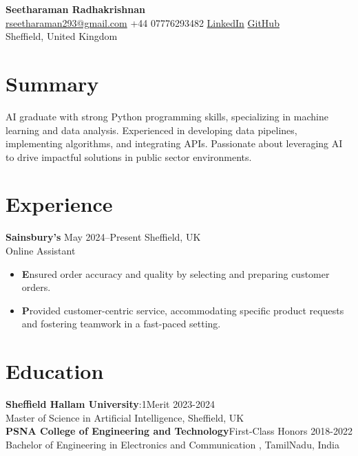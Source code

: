 \documentclass[10 pt, letterpaper]{article}
\makeatletter
\newcommand{\header}{
    \begin{center}
        \LARGE \textbf{Seetharaman Radhakrishnan} \\[0.2cm]
        \normalsize
        \href{mailto:rseetharaman293@gmail.com}{rseetharaman293@gmail.com} \textbar +44 07776293482 \textbar \href{https://linkedin.com/in/seetharaman-r}{LinkedIn} \textbar \href{https://github.com/Seetharamanrs}{GitHub} \\[0.2cm]
        Sheffield, United Kingdom
    \end{center}
}
\makeatother
\begin{document}
\header

\section*{Summary}
AI graduate with strong Python programming skills, specializing in machine learning and data analysis. Experienced in developing data pipelines, implementing algorithms, and integrating APIs. Passionate about leveraging AI to drive impactful solutions in public sector environments.
\vspace{-0.23cm}


\section*{Experience}
\textbf{Sainsbury's} \hfill{May 2024--Present  Sheffield, UK} \\ Online Assistant
\vspace{-0.13cm}
\begin{itemize}

\item \textbf Ensured order accuracy and quality by selecting and preparing customer orders.
\vspace{-0.23cm}
\item \textbf Provided customer-centric service, accommodating specific product requests and fostering teamwork in a fast-paced setting.
\end{itemize}
\vspace{-0.23cm}
\section*{Education}
\textbf{Sheffield Hallam University}:1\textbar Merit \hfill{2023-2024} \\ Master of Science in Artificial Intelligence, Sheffield, UK \\

\textbf{PSNA College of Engineering and Technology}\textbar First-Class Honors \hfill{2018-2022} \\Bachelor of Engineering in Electronics and Communication , TamilNadu, India  \\
\vspace{-0.5cm}

\end{document}
